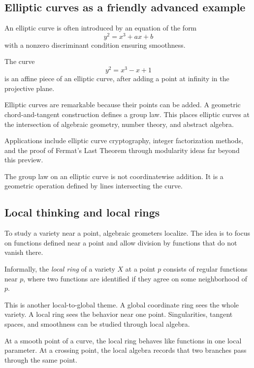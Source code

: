 \subsection{Elliptic curves as a friendly advanced example}

An elliptic curve is often introduced by an equation of the form
\[
y^2=x^3+ax+b
\]
with a nonzero discriminant condition ensuring smoothness.

\begin{example}
The curve
\[
y^2=x^3-x+1
\]
is an affine piece of an elliptic curve, after adding a point at infinity in the
projective plane.
\end{example}

Elliptic curves are remarkable because their points can be added. A geometric
chord-and-tangent construction defines a group law. This places elliptic curves
at the intersection of algebraic geometry, number theory, and abstract algebra.

Applications include elliptic curve cryptography, integer factorization methods,
and the proof of Fermat's Last Theorem through modularity ideas far beyond this
preview.

\begin{trapbox}
The group law on an elliptic curve is not coordinatewise addition. It is a
geometric operation defined by lines intersecting the curve.
\end{trapbox}

\subsection{Local thinking and local rings}

To study a variety near a point, algebraic geometers localize. The idea is to
focus on functions defined near a point and allow division by functions that do
not vanish there.

\begin{definition}
Informally, the \emph{local ring} of a variety $X$ at a point $p$ consists of
regular functions near $p$, where two functions are identified if they agree on
some neighborhood of $p$.
\end{definition}

This is another local-to-global theme. A global coordinate ring sees the whole
variety. A local ring sees the behavior near one point. Singularities, tangent
spaces, and smoothness can be studied through local algebra.

\begin{example}
At a smooth point of a curve, the local ring behaves like functions in one
local parameter. At a crossing point, the local algebra records that two
branches pass through the same point.
\end{example}

